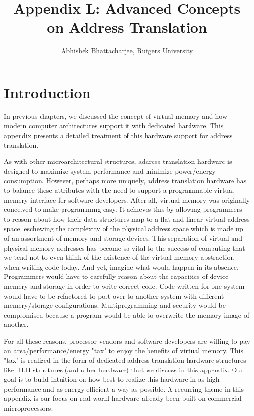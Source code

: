\documentclass{article}
\title{Appendix L: Advanced Concepts on Address Translation}
\author{Abhishek Bhattacharjee, Rutgers University}
\begin{document}
\maketitle

\section{Introduction}\label{sec:introduction}
In previous chapters, we discussed the concept of virtual memory and how modern computer architectures support it with dedicated hardware. This appendix presents a detailed treatment of this hardware support for address translation. 

As with other microarchitectural structures, address translation hardware is designed to maximize system performance and minimize power/energy consumption. However, perhaps more uniquely, address translation hardware has to balance these attributes with the need to support a programmable virtual memory interface for software developers. After all, virtual memory was originally conceived to make programming easy. It achieves this by allowing programmers to reason about how their data structures map to a flat and linear virtual address space, eschewing the complexity of the physical address space which is made up of an assortment of memory and storage devices. This separation of virtual and physical memory addresses has become so vital to the success of computing that we tend not to even think of the existence of the virtual memory abstraction when writing code today. And yet, imagine what would happen in its absence. Programmers would have to carefully reason about the capacities of device memory and storage in order to write correct code. Code written for one system would have to be refactored to port over to another system with different memory/storage configurations. Multiprogramming and security would be compromised because a program would be able to overwrite the memory image of another.  

For all these reasons, processor vendors and software developers are willing to pay an area/performance/energy "tax" to enjoy the benefits of virtual memory. This "tax" is realized in the form of dedicated address translation hardware structures like TLB structures (and other hardware) that we discuss in this appendix. Our goal is to build intuition on how best to realize this hardware in as high-performance and as energy-efficient a way as possible. A recurring theme in this appendix is our focus on real-world hardware already been built on commercial microprocessors.
\end{document}
